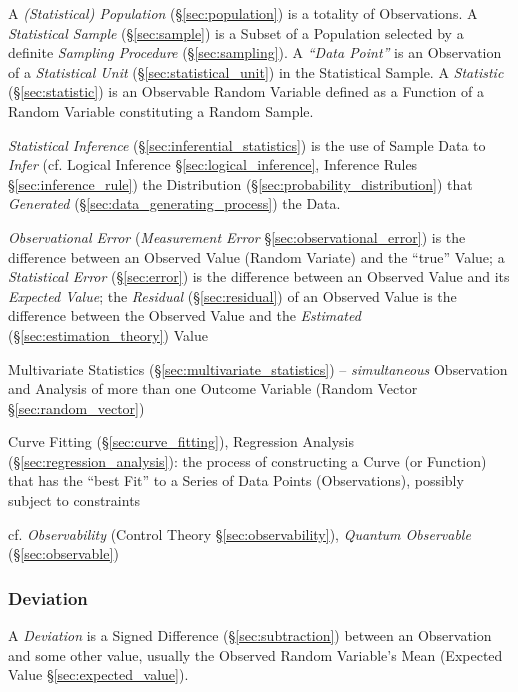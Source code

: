 \fist A \emph{(Statistical) Population} (\S\ref{sec:population}) is a totality
of Observations. A \emph{Statistical Sample} (\S\ref{sec:sample}) is
a Subset of a Population selected by a definite \emph{Sampling Procedure}
(\S\ref{sec:sampling}). A \emph{``Data Point''} is an Observation of a
\emph{Statistical Unit} (\S\ref{sec:statistical_unit}) in the Statistical
Sample. A \emph{Statistic} (\S\ref{sec:statistic}) is an Observable Random
Variable defined as a Function of a Random Variable constituting a Random
Sample.

\fist \emph{Statistical Inference} (\S\ref{sec:inferential_statistics}) is the
use of Sample Data to \emph{Infer} (cf. Logical Inference
\S\ref{sec:logical_inference}, Inference Rules \S\ref{sec:inference_rule}) the
Distribution (\S\ref{sec:probability_distribution}) that \emph{Generated}
(\S\ref{sec:data_generating_process}) the Data.

\fist \emph{Observational Error} (\emph{Measurement Error}
\S\ref{sec:observational_error}) is the
difference between an Observed Value (Random Variate) and the ``true'' Value;
a \emph{Statistical Error} (\S\ref{sec:error}) is the difference between an
Observed Value and its \emph{Expected Value};
the \emph{Residual} (\S\ref{sec:residual}) of an Observed Value is the
difference between the Observed Value and the \emph{Estimated}
(\S\ref{sec:estimation_theory}) Value

\fist Multivariate Statistics (\S\ref{sec:multivariate_statistics}) --
\emph{simultaneous} Observation and Analysis of more than one Outcome Variable
(Random Vector \S\ref{sec:random_vector})

\fist Curve Fitting (\S\ref{sec:curve_fitting}), Regression Analysis
(\S\ref{sec:regression_analysis}): the process of constructing a Curve (or
Function) that has the ``best Fit'' to a Series of Data Points (Observations),
possibly subject to constraints

\fist cf. \emph{Observability} (Control Theory \S\ref{sec:observability}),
\emph{Quantum Observable} (\S\ref{sec:observable})



\subsubsection{Deviation}\label{sec:deviation}

A \emph{Deviation} is a Signed Difference (\S\ref{sec:subtraction}) between an
Observation and some other value, usually the Observed Random Variable's Mean
(Expected Value \S\ref{sec:expected_value}).

